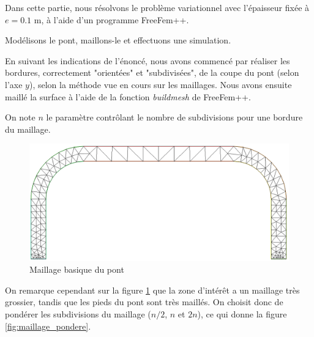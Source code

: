 
Dans cette partie, nous résolvons le problème variationnel avec l'épaisseur fixée à $e=0.1$ m, à l'aide d'un programme FreeFem++.


\begin{problem}{3}
    Modélisons le pont, maillons-le et effectuons une simulation.
\end{problem}


    En suivant les indications de l'énoncé, nous avons commencé par réaliser les bordures, correctement "orientées" et "subdivisées", de la coupe du pont (selon l'axe $y$),
    selon la méthode vue en cours sur les maillages.%
    Nous avons ensuite maillé la surface à l'aide de la fonction \emph{buildmesh} de FreeFem++.

    On note $n$ le paramètre contrôlant le nombre de subdivisions pour une bordure du maillage.

    \begin{figure}      
        \begin{center}
        
            \includegraphics[width=12cm]{imgs/all_maillage_default.PNG}
            \caption{Maillage basique du pont}
            \label{fig:maillage_default}
        
        \end{center}
    \end{figure}

    On remarque cependant sur la figure \ref{fig:maillage_default} que la zone d'intérêt a un maillage très grossier, tandis que les pieds du pont sont très maillés. 
    On choisit donc de pondérer les subdivisions du maillage ($n/2$, $n$ et $2n$), ce qui donne la figure \ref{fig:maillage_pondere}.
    
